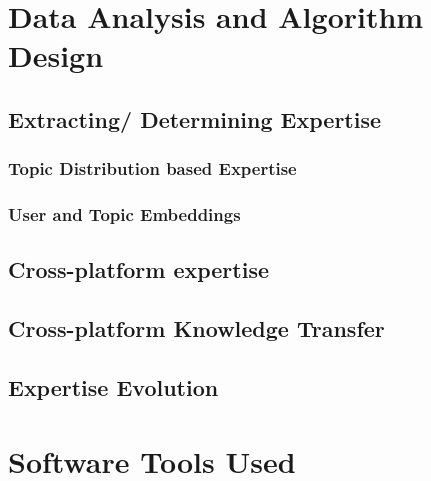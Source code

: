 \section{Data Analysis and Algorithm Design}
    
    \subsection{Extracting/ Determining Expertise}
    
        \subsubsection{Topic Distribution based Expertise}
        
        \subsubsection{User and Topic Embeddings}
        
        
    \subsection{Cross-platform expertise}
    \subsection{Cross-platform Knowledge Transfer}
    \subsection{Expertise Evolution}

\section{Software Tools Used}



    
